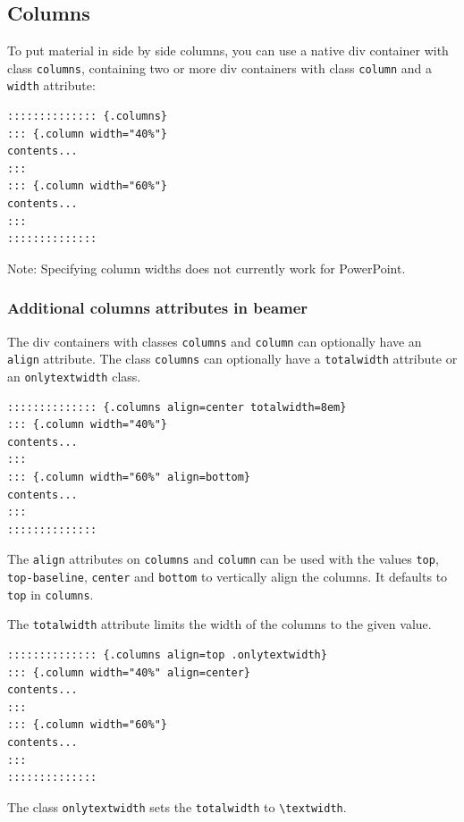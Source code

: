 \documentclass[
]{article}
\begin{document}
\hypertarget{columns}{%
\subsection{Columns}\label{columns}}

To put material in side by side columns, you can use a native div
container with class \texttt{columns}, containing two or more div
containers with class \texttt{column} and a \texttt{width} attribute:

\begin{verbatim}
:::::::::::::: {.columns}
::: {.column width="40%"}
contents...
:::
::: {.column width="60%"}
contents...
:::
::::::::::::::
\end{verbatim}

Note: Specifying column widths does not currently work for PowerPoint.

\hypertarget{additional-columns-attributes-in-beamer}{%
\subsubsection{Additional columns attributes in
beamer}\label{additional-columns-attributes-in-beamer}}

The div containers with classes \texttt{columns} and \texttt{column} can
optionally have an \texttt{align} attribute. The class \texttt{columns}
can optionally have a \texttt{totalwidth} attribute or an
\texttt{onlytextwidth} class.

\begin{verbatim}
:::::::::::::: {.columns align=center totalwidth=8em}
::: {.column width="40%"}
contents...
:::
::: {.column width="60%" align=bottom}
contents...
:::
::::::::::::::
\end{verbatim}

The \texttt{align} attributes on \texttt{columns} and \texttt{column}
can be used with the values \texttt{top}, \texttt{top-baseline},
\texttt{center} and \texttt{bottom} to vertically align the columns. It
defaults to \texttt{top} in \texttt{columns}.

The \texttt{totalwidth} attribute limits the width of the columns to the
given value.

\begin{verbatim}
:::::::::::::: {.columns align=top .onlytextwidth}
::: {.column width="40%" align=center}
contents...
:::
::: {.column width="60%"}
contents...
:::
::::::::::::::
\end{verbatim}

The class \texttt{onlytextwidth} sets the \texttt{totalwidth} to
\texttt{\textbackslash{}textwidth}.
\end{document}
